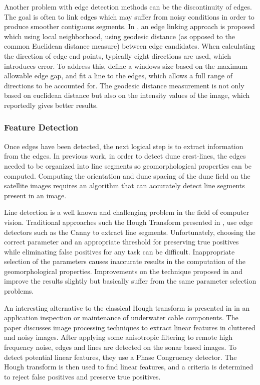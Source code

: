 Another problem with edge detection methods can be the discontinuity of edges. The goal is often to link edges which may suffer from noisy conditions in order to produce smoother contiguous segments. In \cite{Edge_linking_using_geodesic_distance_neighborhood_information}, an edge linking approach is proposed which using local neighborhood, using geodesic distance (as opposed to the common Euclidean distance measure) between edge candidates. When calculating the direction of edge end points, typically eight directions are used, which introduces error. To address this, \cite{Edge_linking_using_geodesic_distance_neighborhood_information} define a windows size based on the maximum allowable edge gap, and fit a line to the edges, which allows a full range of directions to be accounted for. The geodesic distance measurement is not only based on euclidean distance but also on the intensity values of the image, which reportedly gives better results.

\subsubsection{Feature Detection}

Once edges have been detected, the next logical step is to extract information from the edges. In previous work, in order to detect dune crest-lines, the edges needed to be organized into line segments so geomorphological properties can be computed. Computing the orientation and dune spacing of the dune field on the satellite images requires an algorithm that can accurately detect line segments present in an image.

Line detection is a well known and challenging problem in the field of computer vision. Traditional approaches such the Hough Transform presented in \cite{1972_hough_transform_line_detect}, use edge detectors such as the Canny to extract line segments. Unfortunately, choosing the correct parameter and an appropriate threshold for preserving true positives while eliminating false positives for any task can be difficult. Inappropriate selection of the parameters causes inaccurate results in the computation of the geomorphological properties. Improvements on the technique proposed in \cite{1986_extracting_straight_lines} and \cite{2000_meaningful_alignments} improve the results slightly but basically suffer from the same parameter selection problems.

An interesting alternative to the classical Hough transform is presented in \cite{Automated_cable_tracking_sonar_imagery} in an application inspection or maintenance of underwater cable components. The paper discusses image processing techniques to extract linear features in cluttered and noisy images. After applying some anisotropic filtering to remote high frequency noise, edges and lines are detected on the sonar based images. To detect potential linear features, they use a Phase Congruency detector. The Hough transform is then used to find linear features, and a criteria is determined to reject false positives and preserve true positives.


